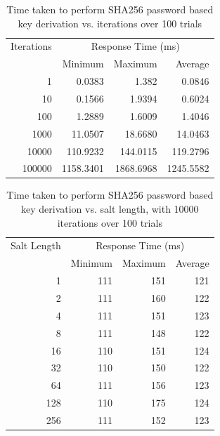 \documentclass[12pt]{report}
\begin{document}
\begin{table}[!h]
    \centering
    \begin{tabular}{| r | r | r | r |}
        \hline
        Iterations & \multicolumn{3}{|c|}{Response Time (ms)} \\ \cline{2-4}
        & Minimum & Maximum & Average \\ \hline
        1 & 0.0383 &  1.382 & 0.0846 \\ \hline
        10 & 0.1566 & 1.9394 & 0.6024 \\ \hline
        100 & 1.2889 & 1.6009 & 1.4046 \\ \hline
        1000 & 11.0507 & 18.6680 & 14.0463 \\ \hline
        10000 & 110.9232 & 144.0115 & 119.2796 \\ \hline
        100000 & 1158.3401 & 1868.6968 & 1245.5582 \\ \hline
    \end{tabular}
    \caption[Timing pbkdf2 on SHA256 varying number of iterations]{Time taken to perform SHA256 password based key derivation vs. iterations over 100 trials}
    \label{tab:sha256-performance}
\end{table}

\begin{table}[!h]
    \centering
    \begin{tabular}{| r | r | r | r |}
        \hline
        Salt Length & \multicolumn{3}{|c|}{Response Time (ms)} \\ \cline{2-4}
        & Minimum & Maximum & Average \\ \hline
        1 & 111 & 151 & 121 \\ \hline
        2 & 111 & 160 & 122 \\ \hline
        4 & 111 & 151 & 123 \\ \hline
        8 & 111 & 148 & 122 \\ \hline
        16 & 110 & 151 & 124  \\ \hline
        32 & 110 & 150 & 122 \\ \hline
        64 & 111 & 156 & 123 \\ \hline
        128 & 110 & 175 & 124 \\ \hline
        256 & 111 & 152 & 123 \\ \hline
    \end{tabular}
    \caption[Timing pbkdf2 on SHA256 varying salt length]{Time taken to perform SHA256 password based key derivation vs. salt length, with 10000 iterations over 100 trials}
    \label{tab:sha256-salt-performance}
\end{table}
\end{document}
